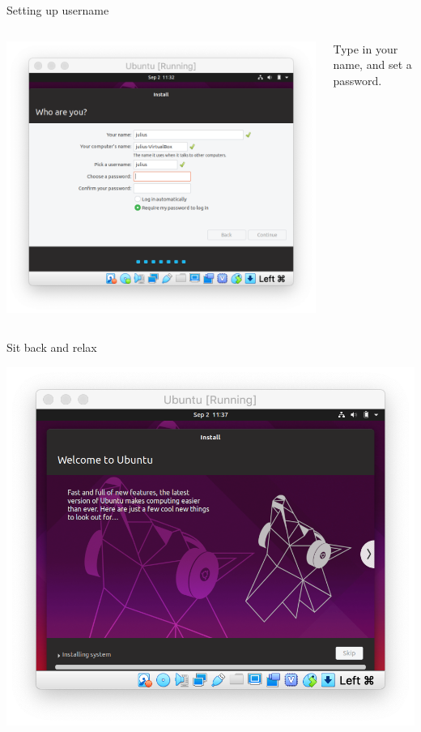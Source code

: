 \documentclass[11pt]{beamer}
\begin{document}
\begin{frame}{Setting up username}
  \begin{columns}
    \begin{column}{0.65\linewidth}
      \includegraphics[width=\linewidth]{ubuntu-user}
    \end{column}
    \begin{column}{0.35\linewidth}
      Type in your name, and set a password.
    \end{column}
  \end{columns}
\end{frame}

\begin{frame}{Sit back and relax}
  \begin{center}
    \includegraphics[width=0.8\linewidth]{ubuntu-installing}
  \end{center}
\end{frame}
\end{document}

